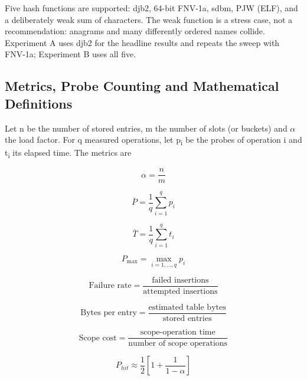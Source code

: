 \documentclass{ieeeaccess}
\begin{document}
Five hash functions are supported: djb2, 64-bit FNV-1a, sdbm, PJW (ELF), and a deliberately weak sum of characters. The weak function is a stress case, not a recommendation: anagrams and many differently ordered names collide. Experiment A uses djb2 for the headline results and repeats the sweep with FNV-1a; Experiment B uses all five.

\subsection{Metrics, Probe Counting and Mathematical Definitions}

Let n be the number of stored entries, m the number of slots (or buckets) and $\alpha$ the load factor. For q measured operations, let p\textsubscript{i} be the probes of operation i and t\textsubscript{i} its elapsed time. The metrics are

\begin{equation}
\alpha = \frac{n}{m}
\end{equation}

\begin{equation}
\bar{P} = \frac{1}{q}\sum_{i=1}^{q} p_i
\end{equation}

\begin{equation}
\bar{T} = \frac{1}{q}\sum_{i=1}^{q} t_i
\end{equation}

\begin{equation}
P_{\max} = \max_{i=1,\ldots,q} p_i
\end{equation}

\begin{equation}
\text{Failure rate} = \frac{\text{failed insertions}}{\text{attempted insertions}}
\end{equation}

\begin{equation}
\text{Bytes per entry} = \frac{\text{estimated table bytes}}{\text{stored entries}}
\end{equation}

\begin{equation}
\text{Scope cost} = \frac{\text{scope-operation time}}{\text{number of scope operations}}
\end{equation}

\begin{equation}
P_{hit} \approx \frac{1}{2}\left[1+\frac{1}{1-\alpha}\right]
\end{equation}
\end{document}
